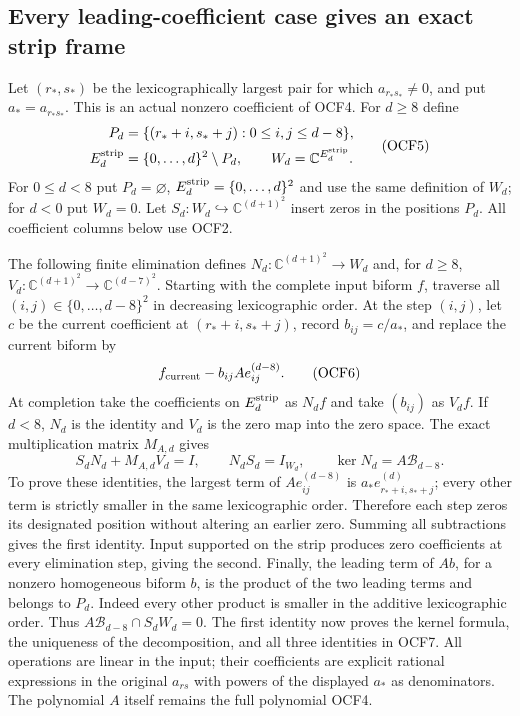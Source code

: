 \documentclass[11pt]{article}
\begin{document}
\subsection{Every leading-coefficient case gives an exact strip frame}

Let $(r_*,s_*)$ be the lexicographically largest pair for which
$a_{r_*s_*}\ne0$, and put $a_*=a_{r_*s_*}$. This is an
actual nonzero coefficient of OCF4. For $d\geq8$ define
\[
 \begin{split}
 P_d&=\{(r_*+i,s_*+j):0\leq i,j\leq d-8\},\\
 E_d^{\rm strip}&=\{0,\ldots,d\}^2\setminus P_d,\qquad
 W_d=\mathbb C^{E_d^{\rm strip}}.
 \end{split}\tag{OCF5}
\]
For $0\leq d<8$ put $P_d=\varnothing$,
$E_d^{\rm strip}=\{0,\ldots,d\}^2$ and use the same definition
of $W_d$; for $d<0$ put $W_d=0$. Let
$S_d:W_d\hookrightarrow\mathbb C^{(d+1)^2}$ insert zeros in
the positions $P_d$. All coefficient columns below use OCF2.

The following finite elimination defines
$N_d:\mathbb C^{(d+1)^2}\to W_d$ and, for $d\geq8$,
$V_d:\mathbb C^{(d+1)^2}\to\mathbb C^{(d-7)^2}$.
Starting with the complete input biform $f$, traverse all
$(i,j)\in\{0,\ldots,d-8\}^2$ in decreasing lexicographic order.
At the step $(i,j)$, let $c$ be the current coefficient at
$(r_*+i,s_*+j)$, record $b_{ij}=c/a_*$, and replace the current
biform by
\[
       f_{\rm current}-b_{ij}A e_{ij}^{(d-8)}.
 \tag{OCF6}
\]
At completion take the coefficients on $E_d^{\rm strip}$ as
$N_df$ and take $(b_{ij})$ as $V_df$. If $d<8$, $N_d$ is the
identity and $V_d$ is the zero map into the zero space.
The exact multiplication matrix $M_{A,d}$ gives
\[
 S_dN_d+M_{A,d}V_d=I,\qquad
 N_dS_d=I_{W_d},\qquad
 \ker N_d=A\mathcal B_{d-8}.
 \tag{OCF7}
\]
To prove these identities, the largest term of
$A e_{ij}^{(d-8)}$ is $a_*e_{r_*+i,s_*+j}^{(d)}$;
every other term is strictly smaller in the same lexicographic
order. Therefore each step zeros its designated position without
altering an earlier zero. Summing all subtractions gives the
first identity. Input supported on the strip produces zero
coefficients at every elimination step, giving the second.
Finally, the leading term of $Ab$, for a nonzero homogeneous
biform $b$, is the product of the two leading terms and belongs
to $P_d$. Indeed every other product is smaller in the additive
lexicographic order. Thus
$A\mathcal B_{d-8}\cap S_dW_d=0$. The first identity now proves
the kernel formula, the uniqueness of the decomposition, and all
three identities in OCF7. All operations are linear in the input;
their coefficients are explicit rational expressions in the
original $a_{rs}$ with powers of the displayed $a_*$ as denominators.
The polynomial $A$ itself remains the full polynomial OCF4.
\end{document}
